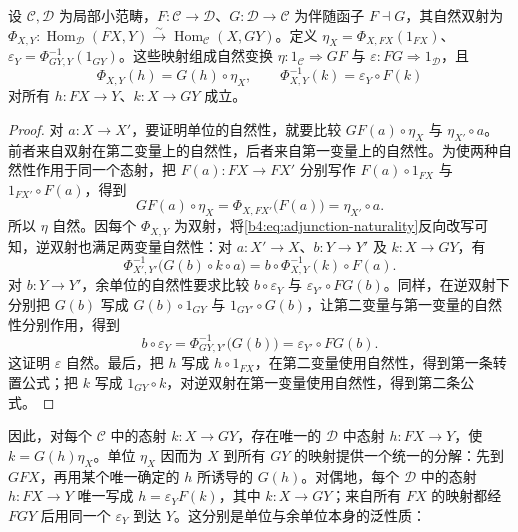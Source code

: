 \begin{proposition}\label{b4:prop:adjunction-transpose-formulas}
	设 \(\mathcal C,\mathcal D\) 为局部小范畴，\(F:\mathcal C\rightarrow\mathcal D\)、\(G:\mathcal D\rightarrow\mathcal C\) 为伴随函子 \(F\dashv G\)，其自然双射为 \(\Phi_{X,Y}:\operatorname{Hom}_{\mathcal D}(FX,Y)\xrightarrow{\sim}\operatorname{Hom}_{\mathcal C}(X,GY)\)。定义 \(\eta_X=\Phi_{X,FX}(1_{FX})\)、\(\varepsilon_Y=\Phi^{-1}_{GY,Y}(1_{GY})\)。这些映射组成自然变换 \(\eta:1_{\mathcal C}\Rightarrow GF\) 与 \(\varepsilon:FG\Rightarrow1_{\mathcal D}\)，且
	\begin{equation}\label{b4:eq:adjunction-transpose-formulas}
		\Phi_{X,Y}(h)=G(h)\circ\eta_X, \qquad \Phi^{-1}_{X,Y}(k)=\varepsilon_Y\circ F(k)
	\end{equation}
	对所有 \(h:FX\rightarrow Y\)、\(k:X\rightarrow GY\) 成立。
\end{proposition}
\begin{proof}
	对 \(a:X\rightarrow X'\)，要证明单位的自然性，就要比较 \(GF(a)\circ\eta_X\) 与 \(\eta_{X'}\circ a\)。前者来自双射在第二变量上的自然性，后者来自第一变量上的自然性。为使两种自然性作用于同一个态射，把 \(F(a):FX\rightarrow FX'\) 分别写作 \(F(a)\circ1_{FX}\) 与 \(1_{FX'}\circ F(a)\)，得到
	\[
		GF(a)\circ\eta_X =\Phi_{X,FX'}\bigl(F(a)\bigr) =\eta_{X'}\circ a.
	\]
	所以 \(\eta\) 自然。因每个 \(\Phi_{X,Y}\) 为双射，将\cref{b4:eq:adjunction-naturality}反向改写可知，逆双射也满足两变量自然性：对 \(a:X'\rightarrow X\)、\(b:Y\rightarrow Y'\) 及 \(k:X\rightarrow GY\)，有
	\[
		\Phi^{-1}_{X',Y'}\bigl(G(b)\circ k\circ a\bigr) =b\circ\Phi^{-1}_{X,Y}(k)\circ F(a).
	\]
	对 \(b:Y\rightarrow Y'\)，余单位的自然性要求比较 \(b\circ\varepsilon_Y\) 与 \(\varepsilon_{Y'}\circ FG(b)\)。同样，在逆双射下分别把 \(G(b)\) 写成 \(G(b)\circ1_{GY}\) 与 \(1_{GY'}\circ G(b)\)，让第二变量与第一变量的自然性分别作用，得到
	\[
		b\circ\varepsilon_Y =\Phi^{-1}_{GY,Y'}\bigl(G(b)\bigr) =\varepsilon_{Y'}\circ FG(b).
	\]
	这证明 \(\varepsilon\) 自然。最后，把 \(h\) 写成 \(h\circ1_{FX}\)，在第二变量使用自然性，得到第一条转置公式；把 \(k\) 写成 \(1_{GY}\circ k\)，对逆双射在第一变量使用自然性，得到第二条公式。
\end{proof}

因此，对每个 \(\mathcal C\) 中的态射 \(k:X\rightarrow GY\)，存在唯一的 \(\mathcal D\) 中态射 \(h:FX\rightarrow Y\)，使 \(k=G(h)\eta_X\)。单位 \(\eta_X\) 因而为 \(X\) 到所有 \(GY\) 的映射提供一个统一的分解：先到 \(GFX\)，再用某个唯一确定的 \(h\) 所诱导的 \(G(h)\)。对偶地，每个 \(\mathcal D\) 中的态射 \(h:FX\rightarrow Y\) 唯一写成 \(h=\varepsilon_YF(k)\)，其中 \(k:X\rightarrow GY\)；来自所有 \(FX\) 的映射都经 \(FGY\) 后用同一个 \(\varepsilon_Y\) 到达 \(Y\)。这分别是单位与余单位本身的泛性质：

